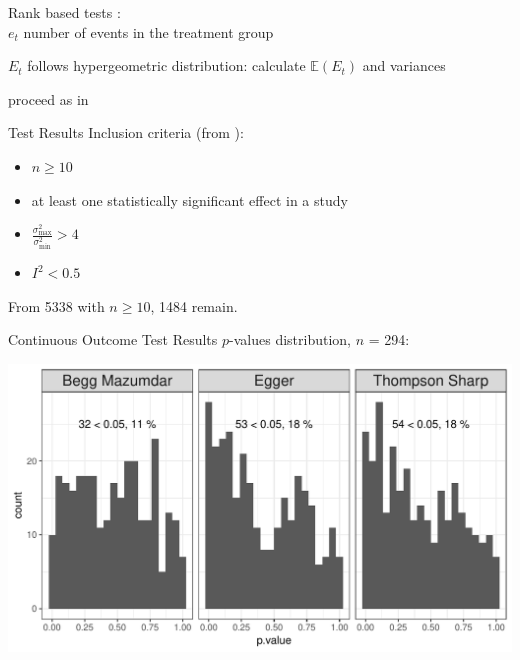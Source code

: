 \documentclass[english]{beamer}\usepackage[]{graphicx}\usepackage[]{color}
\makeatletter
\def\maxwidth{ %
  \ifdim\Gin@nat@width>\linewidth
    \linewidth
  \else
    \Gin@nat@width
  \fi
}
\newenvironment{knitrout}{}{} %
\makeatother
\begin{document}
\begin{frame}{Rank based tests}
\citet{Schwarzer}: \\
$e_t$ number of events in the treatment group

$E_t$ follows hypergeometric distribution: calculate $\mathbb{E}(E_{t})$ and variances

proceed as in \citet{begg.ties}
\end{frame}


\begin{frame}{Test Results}
Inclusion criteria (from \citet{Ioannidis2007}):
\begin{itemize}
\item $n \geq 10$
\item at least one statistically significant effect in a study
\item $\frac{\sigma_{\textrm{max}}^2}{\sigma_{\textrm{min}}^2} > 4$
\item $I^2 < 0.5$
\end{itemize}

From 5338 with $n \geq 10$, 1484 remain.
\end{frame}



\begin{frame}[fragile]{Continuous Outcome Test Results}
$p$-values distribution, $n$ = 294:

\vspace{-2mm}
\begin{knitrout}
\color{fgcolor}
\includegraphics[width=\maxwidth]{figure/unnamed-chunk-5-1} 

\end{knitrout}
\end{frame}
\end{document}
